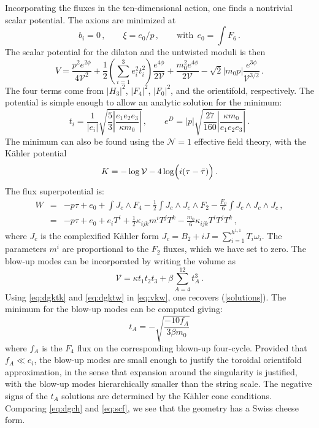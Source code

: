 \documentclass[12pt,a4wide]{article}
\def\V{\mathcal{V}}
\def\be{\begin{equation}}
\def\ee{\end{equation}}
\begin{document}
Incorporating 
the fluxes 
in the ten-dimensional action, one finds a nontrivial scalar potential.
The axions are minimized at 
\begin{equation}
     b_i=0\,, \qquad \xi=e_0/p\,, \qquad \text{with}~~e_0=\int F_6\,.
\end{equation}
The scalar potential for the dilaton and the untwisted moduli is then
\be
V=\frac{p^2e^{2\phi}}{4\V^2}+\frac12 \left(\sum_{i=1}^3 e_i^2 t_i^2\right) \frac{e^{4\phi}}{2\V}+\frac{m_0^2 e^{4\phi}}{2\V}-\sqrt{2} \left | m_0 p\right| \frac{e^{3\phi}}{\V^{3/2}}\,.
\ee
The four terms come from $\left | H_3 \right |^2$, $\left | F_4 \right |^2$, $\left | F_0 \right |^2$, and the orientifold, respectively. The potential is simple enough to allow an analytic solution for the minimum:
\be\label{solutions}
t_i=\frac{1}{\left |e_i \right |} \sqrt{\frac{5}{3}\left |\frac{e_1e_2e_3}{\kappa m_0}\right |}\,, \qquad e^D= |p|\sqrt{\frac{27}{160}\left |\frac{\kappa m_0}{e_1e_2e_3}\right |}\,.
\ee
The minimum can also be found using the $\mathcal{N}=1$ effective field theory, with the K\"ahler potential
\be\label{eq:dgktk}
K=-\log \V- 4\log \Bigl(i(\tau-\bar \tau)\Bigr)\,.
\ee
The flux superpotential is: 
\begin{eqnarray}\label{eq:dgktw}
W&=& -p \tau + e_0 + \int J_c\wedge F_4-\frac12 \int J_c\wedge J_c\wedge F_2-\frac{F_0}{6}\int J_c\wedge J_c \wedge J_c\,, \nonumber \\ 
&=& -p\tau + e_0+e_i T^i+\frac12 \kappa_{ijk} m^i T^j T^k-\frac{m_0}{6}\kappa_{ijk} T^iT^j T^k\,,
\end{eqnarray}
where $J_c$ is the complexified K\"ahler form $J_c=B_2+i J= \sum_{i=1}^{h^{1,1}} T_i \omega_i$. The parameters $m^i$ are proportional to the $F_2$ fluxes, which we have set to zero. The blow-up modes can be incorporated by writing the volume as
\begin{equation}\label{eq:dgch}
\V=\kappa t_1t_2t_3+\beta\sum_{A=4}^{12} t_A^3\,. 
\end{equation} 
Using \eqref{eq:dgktk} and \eqref{eq:dgktw} in \eqref{eq:vkw}, one recovers (\ref{solutions}). The minimum for the blow-up modes can be computed giving:
\be
t_A=-\sqrt{\frac{-10f_A}{3\beta m_0}}
\ee
where $f_A$ is the $F_4$ flux on the corresponding blown-up four-cycle. Provided that
$f_A\ll e_i$, the blow-up modes are small enough to justify the toroidal orientifold 
approximation, in the sense that expansion around the singularity is justified, with the blow-up modes hierarchically smaller than the string scale. 
The negative signs of the $t_A$ solutions are determined by the K\"ahler cone conditions. Comparing \eqref{eq:dgch} and \eqref{eq:scf}, we see that the geometry has a Swiss cheese form.
 
\end{document}
